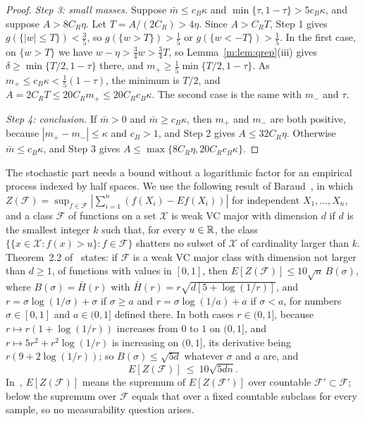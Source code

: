 \begin{proof}
\emph{Step 3: small masses.} Suppose $\bar m\le c_B\kappa$ and $\min\{\tau,1-\tau\}>5c_B\kappa$, and suppose $A>8C_R\eta$. Let $T=A/(2C_R)>4\eta$. Since $A>C_RT$, Step 1 gives $g(\{|w|\le T\})<\frac35$, so $g(\{w>T\})>\frac15$ or $g(\{w<-T\})>\frac15$. In the first case, on $\{w>T\}$ we have $w-\eta>\frac34w>\frac34T$, so Lemma~\ref{m:lem:qrep}(iii) gives $\delta\ge\min\{T/2,1-\tau\}$ there, and $m_+\ge\frac15\min\{T/2,1-\tau\}$. As $m_+\le c_B\kappa<\frac15(1-\tau)$, the minimum is $T/2$, and $A=2C_RT\le20C_Rm_+\le20C_Rc_B\kappa$. The second case is the same with $m_-$ and $\tau$.

\emph{Step 4: conclusion.} If $\bar m>0$ and $\bar m\ge c_B\kappa$, then $m_+$ and $m_-$ are both positive, because $|m_+-m_-|\le\kappa$ and $c_B>1$, and Step 2 gives $A\le32C_R\eta$. Otherwise $\bar m\le c_B\kappa$, and Step 3 gives $A\le\max\{8C_R\eta,20C_Rc_B\kappa\}$.
\end{proof}

The stochastic part needs a bound without a logarithmic factor for an empirical process indexed by half spaces. We use the following result of Baraud~\cite{baraud2016}, in which $Z(\mathcal F)=\sup_{f\in\mathcal F}|\sum_{i=1}^n(f(X_i)-E f(X_i))|$ for independent $X_1,\dots,X_n$, and a class $\mathcal F$ of functions on a set $\mathcal X$ is weak VC major with dimension $d$ if $d$ is the smallest integer $k$ such that, for every $u\in\mathbb{R}$, the class $\{\{x\in\mathcal X:f(x)>u\}:f\in\mathcal F\}$ shatters no subset of $\mathcal X$ of cardinality larger than $k$. Theorem~2.2 of~\cite{baraud2016} states: if $\mathcal F$ is a weak VC major class with dimension not larger than $d\ge1$, of functions with values in $[0,1]$, then $E[Z(\mathcal F)]\le10\sqrt n\,B(\sigma)$, where $B(\sigma)=\bar H(r)$ with $\bar H(r)=r\sqrt{d[5+\log(1/r)]}$, and $r=\sigma\log(1/\sigma)+\sigma$ if $\sigma\ge a$ and $r=\sigma\log(1/a)+a$ if $\sigma<a$, for numbers $\sigma\in[0,1]$ and $a\in(0,1]$ defined there. In both cases $r\in(0,1]$, because $r\mapsto r(1+\log(1/r))$ increases from $0$ to $1$ on $(0,1]$, and $r\mapsto5r^2+r^2\log(1/r)$ is increasing on $(0,1]$, its derivative being $r(9+2\log(1/r))$; so $B(\sigma)\le\sqrt{5d}$ whatever $\sigma$ and $a$ are, and
\begin{equation}\label{m:eq:baraud}
E[Z(\mathcal F)]\ \le\ 10\sqrt{5dn} .
\end{equation}
In~\cite{baraud2016}, $E[Z(\mathcal F)]$ means the supremum of $E[Z(\mathcal F')]$ over countable $\mathcal F'\subset\mathcal F$; below the supremum over $\mathcal F$ equals that over a fixed countable subclass for every sample, so no measurability question arises.

